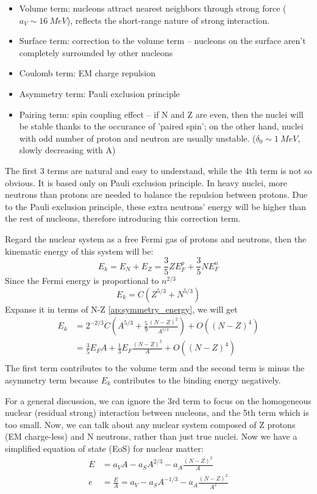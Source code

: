 \begin{itemize}
    \color{black} \item Volume term: nucleons attract nearest neighbors 
	through strong force ($a_V \sim 16\ MeV$), reflects the short-range
	nature of strong interaction.
    \color{blue}  \item Surface term: correction to the volume term -- nucleons 
	on the surface aren't completely surrounded by other nucleons
    \color{green} \item Coulomb term: EM charge repulsion
    \color{red}   \item Asymmetry term: Pauli exclusion principle
    \color{cyan}  \item Pairing term: spin coupling effect -- if N and Z are even,
	then the nuclei will be stable thanks to the occurance of 'paired spin';
	on the other hand, nuclei with odd number of proton and neutron are usually
	unstable. ($\delta_0 \sim 1\ MeV$, slowly decreasing with A)
\end{itemize}

The first 3 terms are natural and easy to understand, while the 4th term is 
not so obvious. It is based only on Pauli exclusion principle. In heavy nuclei,
more neutrons than protons are needed to balance the repulsion between protons.
Due to the Pauli exclusion principle, these extra neutrons' energy will be 
higher than the rest of nucleons, therefore introducing this correction term.

Regard the nuclear system as a free Fermi gas of protons and neutrons, then the 
kinematic energy of this system will be:
$$ E_k = E_N + E_Z = \frac{3}{5}ZE_F^p + \frac{3}{5}NE_F^n $$
Since the Fermi energy is proportional to $n^{2/3}$
$$ E_k = C(Z^{5/3} + N^{5/3})  $$
Expanse it in terms of N-Z \ref{ap:symmetry_energy}, we will get
\begin{equation*}
    \begin{aligned}
	E_k &= 2^{-2/3}C\left(A^{5/3} + \frac{5}{9}\frac{(N-Z)^2}{A^{1/3}} \right) + O((N-Z)^4) \\
	    &= \frac{3}{5} E_F A + \frac{1}{3}E_F\frac{(N-Z)^2}{A} + O((N-Z)^4) \\
    \end{aligned}
\end{equation*}
The first term contributes to the volume term and the second term is minus the 
asymmetry term because $E_k$ contributes to the binding energy negatively.

For a general discussion, we can ignore the 3rd term to focus on the homogeneous
nuclear (residual strong) interaction between nucleons, and the 5th term which is too small.
Now, we can talk about any nuclear system composed of Z protons (EM charge-less) 
and N neutrons, rather than just true nuclei. Now we have a simplified equation
of state (EoS) for nuclear matter:
\begin{equation}
    \label{eq:modified-mass-formula-1}
    \begin{aligned}
	E &= a_V A - a_S A^{2/3} - a_A\frac{(N-Z)^2}{A}  \\
	e &= \frac{E}{A} = a_V - a_S A^{-1/3} - a_A\frac{(N-Z)^2}{A^2}
    \end{aligned}
\end{equation}

